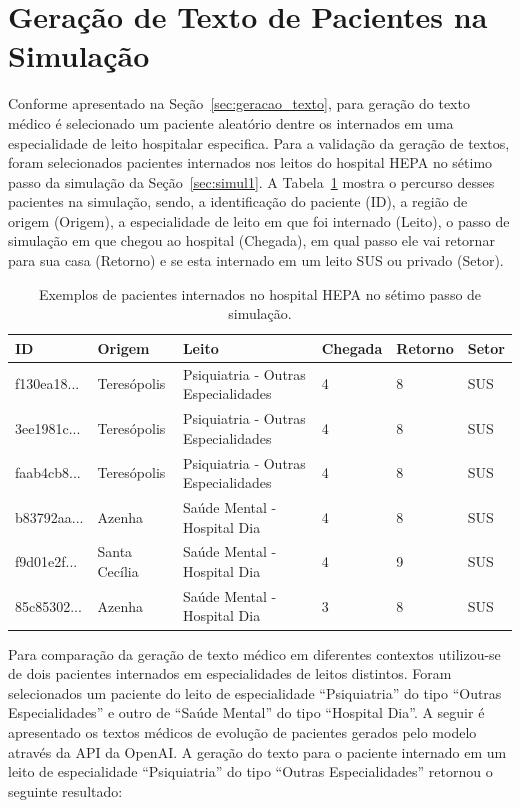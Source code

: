 \section{Geração de Texto de Pacientes na Simulação}
Conforme apresentado na Seção~\ref{sec:geracao_texto}, para geração do texto médico é selecionado um paciente aleatório dentre os internados em uma especialidade de leito hospitalar especifica. Para a validação da geração de textos, foram selecionados pacientes internados nos leitos do hospital HEPA no sétimo passo da simulação da Seção~\ref{sec:simul1}. A Tabela~\ref{table:pacientes} mostra o percurso desses pacientes na simulação, sendo, a identificação do paciente (ID), a região de origem (Origem), a especialidade de leito em que foi internado (Leito), o passo de simulação em que chegou ao hospital (Chegada), em qual passo ele vai retornar para sua casa (Retorno) e se esta internado em um leito SUS ou privado (Setor).
 
\begin{table}[h!]
\centering
\begin{tabular}{ |l|l|l|l|l|l| } 
 \hline
 ID & Origem & Leito & Chegada & Retorno & Setor \\ 
 \hline
 f130ea18... & Teresópolis & Psiquiatria - Outras Especialidades & 4 & 8 & SUS \\ \hline
 3ee1981c... & Teresópolis & Psiquiatria - Outras Especialidades & 4 & 8 & SUS \\ \hline
 faab4cb8... & Teresópolis & Psiquiatria - Outras Especialidades & 4 & 8 & SUS \\ \hline
 b83792aa... & Azenha & Saúde Mental - Hospital Dia & 4 & 8 & SUS \\ \hline 
 f9d01e2f... & Santa Cecília & Saúde Mental - Hospital Dia & 4 & 9 & SUS  \\ \hline 
 85c85302... & Azenha & Saúde Mental - Hospital Dia & 3 & 8 & SUS \\ \hline
 \end{tabular}
\caption{Exemplos de pacientes internados no hospital HEPA no sétimo passo de simulação.}
\label{table:pacientes}
\end{table}

Para comparação da geração de texto médico em diferentes contextos utilizou-se de dois pacientes internados em especialidades de leitos distintos. Foram selecionados um paciente do leito de especialidade ``Psiquiatria'' do tipo ``Outras Especialidades'' e outro de ``Saúde Mental'' do tipo ``Hospital Dia''. A seguir é apresentado os textos médicos de evolução de pacientes gerados pelo modelo através da API da OpenAI. A geração do texto para o paciente internado em um leito de especialidade ``Psiquiatria'' do tipo ``Outras Especialidades'' retornou o seguinte resultado:

